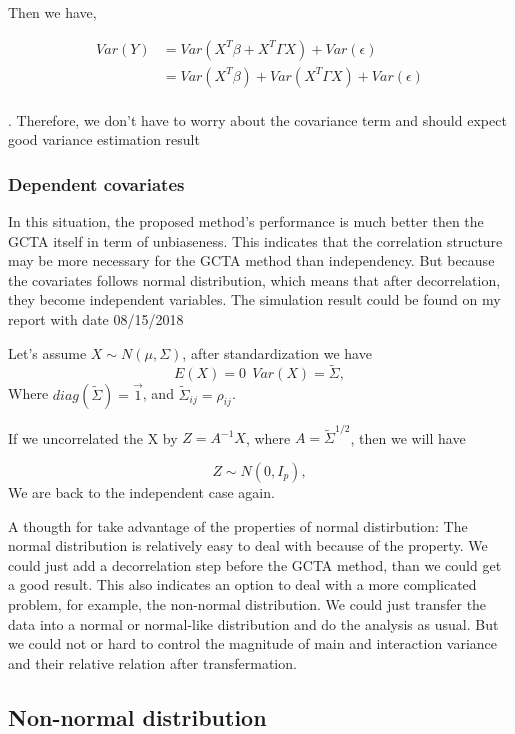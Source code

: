 \documentclass[]{article}
\begin{document}
Then we have,

\begin{align*}
Var(Y) &= Var(X^T\beta + X^T\Gamma X) + Var(\epsilon) \\
         &= Var(X^T\beta) + Var(X^T\Gamma X) + Var(\epsilon) \\
\end{align*}

. Therefore, we don't have to worry about the covariance term and should
expect good variance estimation result

\subsubsection{Dependent covariates}\label{dependent-covariates}

In this situation, the proposed method's performance is much better then
the GCTA itself in term of unbiaseness. This indicates that the
correlation structure may be more necessary for the GCTA method than
independency. But because the covariates follows normal distribution,
which means that after decorrelation, they become independent variables.
The simulation result could be found on my report with date 08/15/2018

Let's assume \(X \sim N(\mu, \Sigma)\), after standardization we have \[
  E(X) = 0 ~~ Var(X) = \tilde{\Sigma},
\] Where \(diag(\tilde{\Sigma}) = \vec{1}\), and
\(\tilde{\Sigma}_{ij} = \rho_{ij}\).

If we uncorrelated the X by \(Z = A^{-1}X\), where
\(A = \tilde{\Sigma}^{1/2}\), then we will have

\[
  Z \sim N(0,I_p), 
\] We are back to the independent case again.

A thougth for take advantage of the properties of normal distirbution:
The normal distribution is relatively easy to deal with because of the
property. We could just add a decorrelation step before the GCTA method,
than we could get a good result. This also indicates an option to deal
with a more complicated problem, for example, the non-normal
distribution. We could just transfer the data into a normal or
normal-like distribution and do the analysis as usual. But we could not
or hard to control the magnitude of main and interaction variance and
their relative relation after transfermation.

\subsection{Non-normal distribution}\label{non-normal-distribution}
\end{document}
